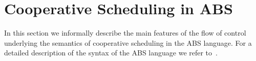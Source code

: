 

\section{Cooperative Scheduling in ABS}
\label{lang}
In this section we informally describe the main features of the flow of control
underlying the semantics of cooperative scheduling in the ABS language.
For a detailed description of the syntax of the ABS language we refer to~\cite{abs}.


